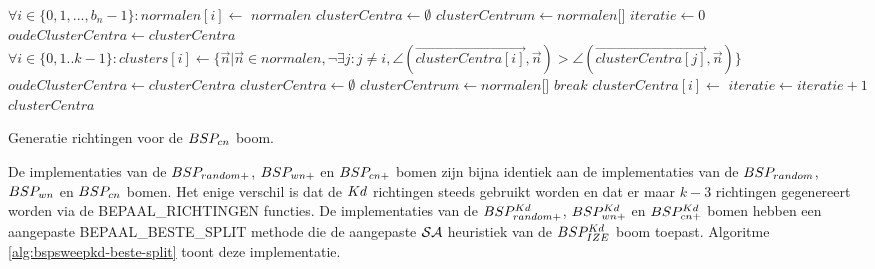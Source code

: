 \begin{dutchalgorithm}
    \begin{algorithmic}       
            \State $\forall i \in \{0,1,...,b_n-1\}: normalen[i] \gets $
                \State \Return $normalen$
            \EndIf
            \State $clusterCentra \gets \emptyset$
                \State $clusterCentrum \gets normalen[$$]$
                \State {}
            \EndWhile
            \State $iteratie \gets 0$
            \State $oudeClusterCentra \gets clusterCentra$
                \State $\forall i \in \{0,1..k-1\}: clusters[i] \gets \{\vec{n} | \vec{n} \in normalen, \neg\exists j: j \neq i, \angle(\vec{clusterCentra[i]}, \vec{n}) > \angle(\vec{clusterCentra[j]}, \vec{n})\} $
                \State $oudeClusterCentra \gets clusterCentra$
                        \State $clusterCentra \gets \emptyset$
                            \State $clusterCentrum \gets normalen[$$]$
                            \State {}
                            \State $break$
                        \EndWhile
                    \EndIf
                    \State $clusterCentra[i] \gets $ 
                \EndFor
                \State $iteratie \gets iteratie + 1$
            \EndWhile
            \State \Return $clusterCentra$
        \EndFunction
    \end{algorithmic}
    \caption{Generatie richtingen voor de $BSP_{cn}$  boom.}
    \label{alg:bspcluster-richtingen}
\end{dutchalgorithm}

De implementaties van de $BSP_{random+}$, $BSP_{wn+}$ en $BSP_{cn+}$ bomen zijn bijna identiek aan de implementaties van de $BSP_{random}$, $BSP_{wn}$ en $BSP_{cn}$ bomen.
Het enige verschil is dat de $Kd$ richtingen steeds gebruikt worden en dat er maar $k - 3$ richtingen gegenereert worden via de BEPAAL\_RICHTINGEN functies.
De implementaties van de $BSP^{Kd}_{random+}$, $BSP^{Kd}_{wn+}$ en $BSP^{Kd}_{cn+}$ bomen hebben een aangepaste BEPAAL\_BESTE\_SPLIT methode die de aangepaste $\mathcal{SA}$ heuristiek van de $BSP^{Kd}_{IZE}$ boom toepast.
Algoritme \ref{alg:bspsweepkd-beste-split} toont deze implementatie.

